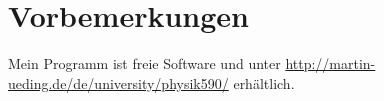 
\chapter*{Vorbemerkungen}

Mein Programm ist freie Software und unter
\url{http://martin-ueding.de/de/university/physik590/} erhältlich.

